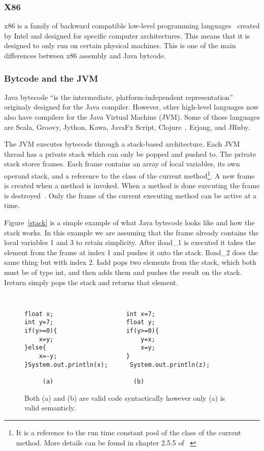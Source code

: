 \documentclass{sig-alternate}
\begin{document}
\subsubsection{X86}
x86 is a family of backward compatible low-level programming languages~\cite{x86assembly:2014} created by Intel and designed for specific computer architectures. This means that it is designed to only run on certain physical machines. This is one of the main differences between x86 assembly and Java bytcode. 

\subsubsection{ Bytcode and the JVM}
Java bytecode ``is the intermediate, platform-independent representation''~\cite{FINCH2:2009} originaly designed for the Java compiler. However, other high-level languages now also have compilers for the Java Virtual Machine (JVM). Some of those languages are Scala, Groovy, Jython, Kawa, JavaFx Script, Clojure~\cite{FINCH:2011}, Erjang, and JRuby.

The JVM executes bytecode through a stack-based architecture. Each JVM thread has a private stack which can only be popped and pushed to. The private stack stores frames. Each frame contains an array of local variables, its own operand stack, and a reference to the class of the current method\footnote{It is a reference to the run time constant pool of the class of the current method. More details can be found in chapter 2.5.5 of ~\cite{JVMspec:2013}}. A new frame is created when a method is invoked. When a method is done executing the frame is destroyed~\cite{Oracle:2013}. Only the frame of the current executing method can be active at a time.

Figure~\ref{stack} is a simple example of what Java bytecode looks like and how the stack works. In this example we are assuming that the frame already contains the local variables 1 and 3 to retain simplicity. After iload\_1 is executed it takes the element from the frame at index 1 and pushes it onto the stack. Iload\_2 does the same thing but with index 2. Iadd pops two elements from the stack, which both must be of type int, and then adds them and pushes the result on the stack. Ireturn simply pops the stack and returns that element. 

\begin{figure}
\centering
{\tt
\begin{verbatim}
float x;                    int x=7;
int y=7;                    float y;
if(y>=0){                   if(y>=0){
    x=y;                        y=x;
}else{                          x=y;
    x=-y;                   }
}System.out.println(x);      System.out.println(z);	
     
     (a)                      (b)

\end{verbatim}
}
\caption{Both (a) and (b) are valid code syntactically however only (a) is valid semanticly.}
\label{semantics}
\end{figure}
\end{document}
